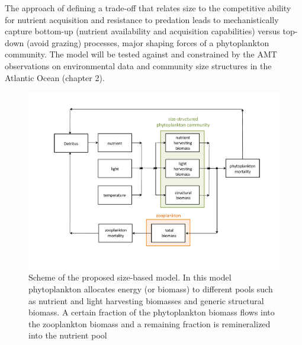 The approach of defining a trade-off that relates size to the competitive ability for nutrient acquisition and resistance to predation \citep{Merico2009} leads to mechanistically capture bottom-up (nutrient availability and acquisition capabilities) versus top-down (avoid grazing) processes, major shaping forces of a phytoplankton community. The model will be tested against and constrained by the AMT observations on environmental data and community size structures in the Atlantic Ocean (chapter 2).  

\begin{figure}
\centering
\includegraphics[trim = 15mm 50mm 15mm 25mm, clip, width=1\linewidth]{./Chp3-Further/model-scheme.pdf}
\caption[Scheme]{\small {Scheme of the proposed size-based model. In this model phytoplankton allocates energy (or biomass) to different pools such as nutrient and light harvesting biomasses and generic structural biomass. A certain fraction of the phytoplankton biomass flows into the zooplankton biomass and a remaining fraction is remineralized into the nutrient pool}}
\label{model}
\end{figure}

